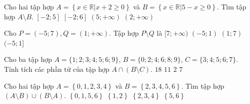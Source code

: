 \begin{ex}%
	Cho hai tập hợp $A=\left\{ x\in \mathbb{R}\big| x+2\geq 0 \right\}$ và $B=\left\{ x\in \mathbb{R}\big| 5-x\geq 0 \right\}$. Tìm tập hợp  $A \setminus B$.
	\choice 
		{$\left[-2;5  \right]$}
		{$\left[-2;6  \right]$}
		{\True $\left(  5;+\infty \right)$}
		 {$\left( 2;+\infty \right)$}
\end{ex}

\begin{ex}%
	Cho $P=(-5;7), Q =(1;+\infty)$. Tập hợp $P \setminus  Q$ là
	 \choice
		 {$[7;+\infty)$}
		 {$(-5;1)$}
		{$(1;7)$} 
		 {\True $(-5;1]$}
	 \loigiai{
		$x \in P \setminus Q \Leftrightarrow \heva{&x \in (-5;7)\\&x \not \in  (1;+\infty)} \Leftrightarrow \heva{&-5 <x<7\\&x \le 1} \Leftrightarrow -5 <x \le 1$.\\
		Do đó $P \setminus Q =(-5;1]$ 
	 }
\end{ex}

\begin{ex}%
	Cho ba tập hợp $A=\{1; 2; 3; 4; 5; 6; 9\}$, $B=\{0; 2; 4; 6; 8; 9\}$, $C=\{3; 4; 5; 6; 7\}$. Tính tích các phần tử  của tập hợp $A \cap (B \setminus C)$.
	 \choice
		{\True  $18$}
		 {$11$}
		{$2$} 
		{$7$} 
\end{ex}

\begin{ex}%
	Cho hai tập hợp $A =\left\{0,1,2, 3, 4 \right\}$ và $B =\left\{ 2, 3, 4, 5, 6\right\}$. Tìm  tập hợp $(A \setminus B) \cup (B \setminus A)$.
	 \choice
		 {\True $\left\{ 0, 1, 5, 6 \right\}$}
		{$\left\{ 1, 2  \right\}$}
		{$\left\{ 2, 3, 4  \right\}$}
		{$\left\{ 5, 6 \right\}$} 
\end{ex}

